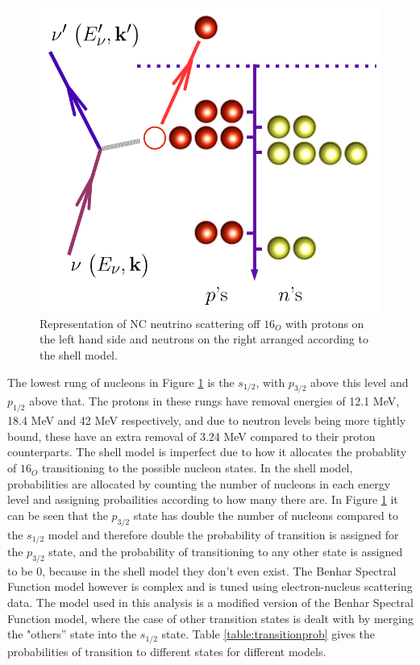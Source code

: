 \begin{figure}
    \includegraphics[width=\textwidth]{Figures/ncqebenharspectral.png}
    \caption{Representation of NC neutrino scattering off $16_{O}$ with protons on the left hand side and neutrons on the right arranged according to the shell model. }
\label{fig:ncqebenharspectral}
\end{figure}

The lowest rung of nucleons in Figure \ref{fig:ncqebenharspectral} is the $s_{1/2}$, with $p_{3/2}$ above this level and $p_{1/2}$ above that. The protons in these rungs have removal energies of 12.1 MeV, 18.4 MeV and 42 MeV respectively, and due to neutron levels being more tightly bound, these have an extra removal of 3.24 MeV compared to their proton counterparts. The shell model is imperfect due to how it allocates the probablity of $16_{O}$ transitioning to the possible nucleon states. In the shell model, probabilities are allocated by counting the number of nucleons in each energy level and assigning probailities according to how many there are. In Figure \ref{fig:ncqebenharspectral} it can be seen that the $p_{3/2}$ state has double the number of nucleons compared to the $s_{1/2}$ model and therefore double the probability of transition is assigned for the $p_{3/2}$ state, and the probability of transitioning to any other state is assigned to be 0, because in the shell model they don't even exist. The Benhar Spectral Function model however is complex and is tuned using electron-nucleus scattering data. The model used in this analysis is a modified version of the Benhar Spectral Function model, where the case of other transition states is dealt with by merging the "others'' state into the $s_{1/2}$ state. Table \ref{table:transitionprob} gives the probabilities of transition to different states for different models. 

